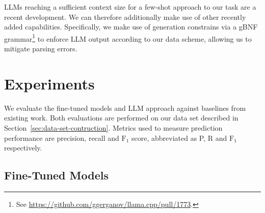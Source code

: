 LLMs reaching a sufficient context size for a few-shot approach to our task are a recent development. We can therefore additionally make use of other recently added capabilities. Specifically, we make use of generation constrains via a gBNF grammar\footnote{See \url{https://github.com/ggerganov/llama.cpp/pull/1773}.} to enforce LLM output according to our data scheme, allowing us to mitigate parsing errors.

\section{Experiments}\label{sec:experiments}

We evaluate the fine-tuned models and LLM approach against baselines from existing work. Both evaluations are performed on our data set described in Section~\ref{sec:data-set-contruction}. Metrics used to measure prediction performance are precision, recall and $\text{F}_1$ score, abbreviated as P, R and $\text{F}_1$ respectively.

\subsection{Fine-Tuned Models}


